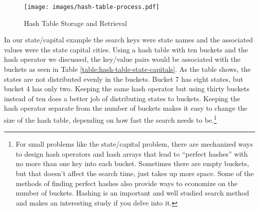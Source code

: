 \begin{figure}
\begin{center}
\texttt{[image: images/hash-table-process.pdf]}
\end{center}
\caption{Hash Table Storage and Retrieval}
\label{fig:hash-table-process}
\end{figure}

In our state/capital example the search keys were state names and the
associated values were the state capital cities. 
Using a hash table with ten buckets and the hash operator
we discussed, the key/value pairs would be associated with the
buckets as seen in Table \ref{table:hash-table-state-capitals}.
As the table shows, the states are not distributed evenly in the
buckets. Bucket 7 has
eight states, but bucket 4 has only two.
Keeping the same hash operator but using thirty buckets
instead of ten does a better job of distributing states to buckets. 
Keeping the hash operator separate from the number of buckets
makes it easy to change the size of the
hash table, depending on how fast the search needs
to be.\footnote{For small problems like the state/capital problem,
there are mechanized ways to design hash operators and
hash arrays that lead to ``perfect hashes'' with no 
more than one key into each bucket. Sometimes there are
empty buckets, but that doesn't affect the search time,
just takes up more space. Some of the methods of
finding perfect hashes also provide ways to economize
on the number of buckets.
Hashing is an important and well studied search method
and makes an interesting study if you delve into it.}

